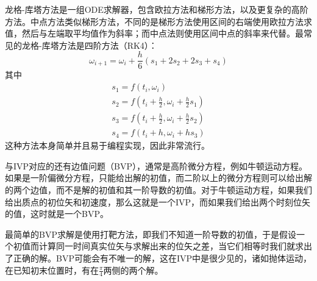 \documentclass[UTF8,a4paper,10pt]{ctexart}
\begin{document}
\begin{multicols}{2}
            龙格-库塔方法是一组ODE求解器，包含欧拉方法和梯形方法，以及更复杂的高阶方法。中点方法类似梯形方法，不同的是梯形方法使用区间的右端使用欧拉方法求值，然后与左端取平均值作为斜率；而中点法则使用区间中点的斜率来代替。最常见的龙格-库塔方法是四阶方法（RK4）：
            \begin{equation}
                    \omega_{i+1} = \omega_i + \frac{h}{6}(s_1+2s_2+2s_3+s_4)
            \end{equation}
            其中
            \begin{equation*}
                \begin{array}{l}
                    s_1 = f(t_i,\omega_i)\\
                    s_2 = f(t_i+\frac{h}{2},\omega_i+\frac{h}{2}s_1)\\
                    s_3 = f(t_i+\frac{h}{2},\omega_i+\frac{h}{2}s_2)\\
                    s_4 = f(t_i+h,\omega_i+hs_3)
                \end{array}
            \end{equation*}
            这种方法本身简单并且易于编程实现，因此非常流行。\par
            与IVP对应的还有边值问题（BVP），通常是高阶微分方程，例如牛顿运动方程。如果是一阶偏微分方程，只能给出解的初值，而二阶以上的微分方程则可以给出解的两个边值，而不是解的初值和其一阶导数的初值。对于牛顿运动方程，如果我们给出质点的初位矢和初速度，那么这就是一个IVP，而如果我们给出两个时刻位矢的值，这时就是一个BVP。\par
            最简单的BVP求解是使用打靶方法，即我们不知道一阶导数的初值，于是假设一个初值而计算同一时间真实位矢与求解出来的位矢之差，当它们相等时我们就求出了正确的解。BVP可能会有不唯一的解，这在IVP中是很少见的，诸如抛体运动，在已知初末位置时，有在$\frac{\pi}{4}$两侧的两个解。

\end{multicols}
\end{document}
